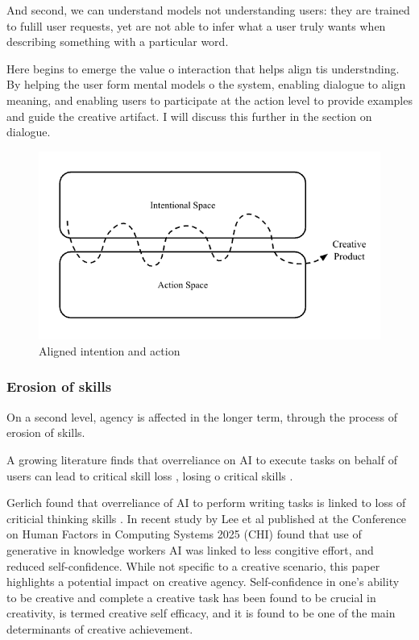 And second, we can understand models not understanding users: they are trained to fulill user requests, yet are not able to infer what a user truly wants when describing something with a particular word. 

Here begins to emerge the value o interaction that helps align tis understnding. By helping the user form mental models o the system, enabling dialogue to align meaning, and enabling users to participate at the action level to provide examples and guide the creative artifact. I will discuss this further in the section on dialogue. 

\begin{figure}
    \centering
    \includegraphics[width=1\linewidth]{alignedintention.png}
    \caption{Aligned intention and action}
    \label{fig:enter-label}
\end{figure}

\subsubsection{Erosion of skills}

On a second level, agency is affected in the longer term, through the process of erosion of skills.

A growing literature finds that overreliance on AI to execute tasks on behalf of users can lead to critical skill loss \cite{Heersmink2024-mk}, losing o critical skills \cite{Rafner2021-tm}.  


Gerlich found that overreliance of AI to perform writing tasks is linked to loss of criticial thinking skills  \cite{Gerlich2025-as}. In recent study by Lee et al published at the Conference on Human Factors in Computing Systems 2025 (CHI) \cite{Lee2025-dw} found that use of generative in knowledge workers AI was linked to less congitive effort, and reduced self-confidence. While not specific to a creative scenario, this paper highlights a potential impact on creative agency. Self-confidence in one's ability to be creative and complete a creative task has been found to be crucial in creativity, is termed creative self efficacy, and it is found to be one of the main determinants of creative achievement. 

